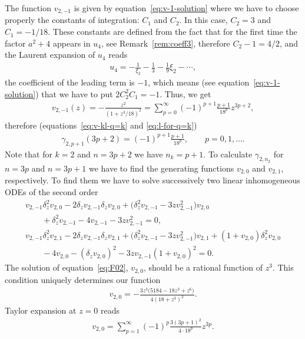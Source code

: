 \documentclass[pdftex]{sigma}
\numberwithin{equation}{section}
\begin{document}
The function $v_{2,-1}$ is given by equation~\eqref{eq:v-1-solution} where we have to choose properly the constants
of integration: $C_1$ and $C_2$. In this case, $C_2=3$ and $C_1=-1/18$. These constants are defined from the fact that
for the first time the factor $a^2+4$ appears in $u_4$, see Remark~\ref{rem:coeff3}, therefore $C_2-1=4/2$, and the Laurent
expansion of $u_4$ reads
\begin{gather*}
u_4=-\frac{1}{\xi_2}-\frac13-\frac19\xi_2-\cdots,
\end{gather*}
the coefficient of the leading term is $-1$,
which means (see equation~\eqref{eq:v-1-solution}) that we have to put $2C_2^2C_1=-1$. Thus, we get
\begin{gather*}
v_{2,-1}(z)=-\frac{z^2}{(1+z^3/18)^2}=\sum_{p=0}^\infty(-1)^{p+1}\frac{p+1}{18^p}z^{3p+2},
\end{gather*}
therefore (equations~\eqref{eq:v-kl-q=k} and \eqref{eq:l-for-q=k})
\begin{gather}\label{eq:gamma2p+1-general}
\gamma_{2,p+1}(3p+2)=(-1)^{p+1}\frac{p+1}{18^p}, \qquad p=0,1,\ldots.
\end{gather}
Note that for $k=2$ and $n=3p+2$ we have $n_k=p+1$. To calculate $\gamma_{2,n_2}$ for $n=3p$ and $n=3p+1$ we have to find
the generating functions $v_{2,0}$ and $v_{2,1}$, respectively. To find them we have to solve successively two linear
inhomogeneous ODEs of the second order
\begin{gather}
v_{2,-1}\delta_{z}^2v_{2,0}-2\delta_{z}v_{2,-1}\delta_{z}v_{2,0}+\big(\delta_{z}^2v_{2,-1}-3zv_{2,-1}^2\big)v_{2,0}\nonumber\\
\qquad{}+\delta_z^2v_{2,-1} -4v_{2,-1}-3zv_{2,-1}^2=0,\label{eq:F02}\\
v_{2,-1}\delta_{z}^2v_{2,1}-2\delta_{z}v_{2,-1}\delta_{z}v_{2,1}+\big(\delta_{z}^2v_{2,-1}-3zv_{2,-1}^2\big)v_{2,1}
+(1+v_{2,0})\delta_z^2v_{2,0}\nonumber\\
\qquad{}-4v_{2,0}-(\delta_zv_{2,0})^2-3zv_{2,-1}(1+v_{2,0})^2=0.\label{eq:F12}
\end{gather}
The solution of equation~\eqref{eq:F02}, $v_{2,0}$, should be a rational function of $z^3$. This condition uniquely determines our function
\begin{gather*}
v_{2,0}=-\frac{3z^3\big(5184-18z^3+z^6\big)}{4(18+z^3)^3}.
\end{gather*}
Taylor expansion at $z=0$ reads
\begin{gather*}
v_{2,0}=\sum_{p=1}^\infty(-1)^p\frac{3(3p+1)^2}{4\cdot18^p}z^{3p}.
\end{gather*}
\end{document}
